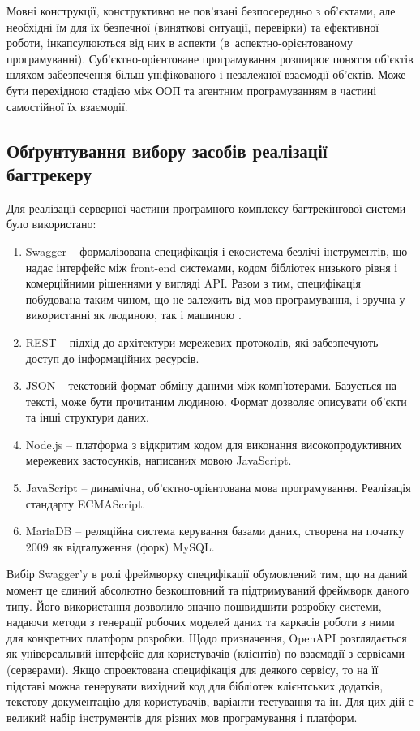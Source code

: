 \documentclass[../main.tex]{subfiles}
\begin{document}
	Мовні конструкції, конструктивно не пов'язані безпосередньо з об'єктами, але необхідні їм для їх безпечної (виняткові ситуації, перевірки) та ефективної роботи, інкапсулюються від них в аспекти (в~аспектно-\linebreak[0]орієнтованому програмуванні). Суб'єктно-орієнтоване програмування розширює поняття об'єктів шляхом забезпечення більш уніфікованого і незалежної взаємодії об'єктів. Може бути перехідною стадією між ООП та агентним програмуванням в частині самостійної їх взаємодії.
	
	\subsection{Обґрунтування вибору засобів реалізації багтрекеру}
		Для реалізації серверної частини програмного комплексу багтрекінгової системи було використано:
		\begin{enumerate}
			\item Swagger -- формалізована специфікація і екосистема безлічі інструментів, що надає інтерфейс між front-end системами, кодом бібліотек низького рівня і комерційними рішеннями у вигляді API. Разом з тим, специфікація побудована таким чином, що не залежить від мов програмування, і зручна у використанні як людиною, так і машиною \cite{swagger}.
			\item REST -- підхід до архітектури мережевих протоколів, які забезпечують доступ до інформаційних ресурсів.
			\item JSON -- текстовий формат обміну даними між комп'ютерами. Базується на тексті, може бути прочитаним людиною. Формат дозволяє описувати об'єкти та інші структури даних.
			\item Node.js -- платформа з відкритим кодом для виконання високопродуктивних мережевих застосунків, написаних мовою JavaScript.
			\item JavaScript -- динамічна, об'єктно-орієнтована мова програмування. Реалізація стандарту ECMAScript.
			\item MariaDB -- реляційна система керування базами даних, створена на початку 2009 як відгалуження (форк) MySQL.
		\end{enumerate}
		
		Вибір Swagger'у в ролі фреймворку специфікації обумовлений тим, що на даний момент це єдиний абсолютно безкоштовний та підтримуваний фреймворк даного типу. Його використання дозволило значно пошвидшити розробку системи, надаючи методи з генерації робочих моделей даних та каркасів роботи з ними для конкретних платформ розробки. Щодо призначення, OpenAPI розглядається як універсальний інтерфейс для користувачів (клієнтів) по взаємодії з сервісами (серверами). Якщо спроектована специфікація для деякого сервісу, то на її підставі можна генерувати вихідний код для бібліотек клієнтських додатків, текстову документацію для користувачів, варіанти тестування та ін. Для цих дій є великий набір інструментів для різних мов програмування і платформ.
		
\end{document}
